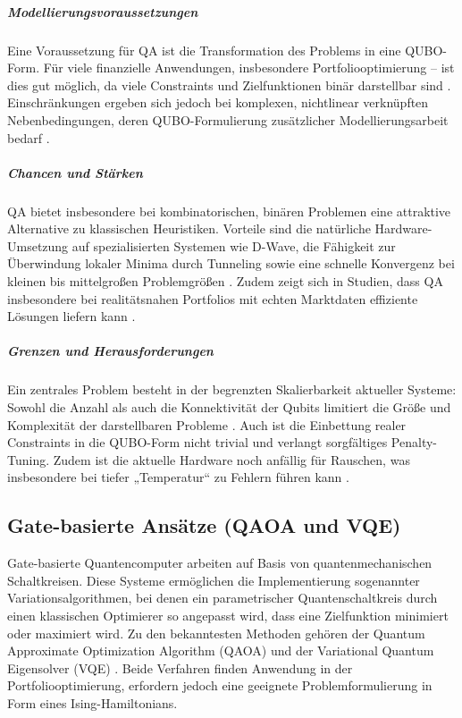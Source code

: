 \subparagraph{Modellierungsvoraussetzungen}
Eine Voraussetzung für QA ist die Transformation des Problems in eine QUBO-Form. Für viele finanzielle Anwendungen, insbesondere Portfoliooptimierung – ist dies gut möglich, da viele Constraints und Zielfunktionen binär darstellbar sind \cite{mugel_dynamic_2022}. Einschränkungen ergeben sich jedoch bei komplexen, nichtlinear verknüpften Nebenbedingungen, deren QUBO-Formulierung zusätzlicher Modellierungsarbeit bedarf \cite{sakuler_real-world_2025}.

\subparagraph{Chancen und Stärken}
QA bietet insbesondere bei kombinatorischen, binären Problemen eine attraktive Alternative zu klassischen Heuristiken. Vorteile sind die natürliche Hardware-Umsetzung auf spezialisierten Systemen wie D-Wave, die Fähigkeit zur Überwindung lokaler Minima durch Tunneling sowie eine schnelle Konvergenz bei kleinen bis mittelgroßen Problemgrößen \cite{mugel_dynamic_2022, sakuler_real-world_2025}. Zudem zeigt sich in Studien, dass QA insbesondere bei realitätsnahen Portfolios mit echten Marktdaten effiziente Lösungen liefern kann \cite{mugel_dynamic_2022}.

\subparagraph{Grenzen und Herausforderungen}
Ein zentrales Problem besteht in der begrenzten Skalierbarkeit aktueller Systeme: Sowohl die Anzahl als auch die Konnektivität der Qubits limitiert die Größe und Komplexität der darstellbaren Probleme \cite{sakuler_real-world_2025}. Auch ist die Einbettung realer Constraints in die QUBO-Form nicht trivial und verlangt sorgfältiges Penalty-Tuning. Zudem ist die aktuelle Hardware noch anfällig für Rauschen, was insbesondere bei tiefer „Temperatur“ zu Fehlern führen kann \cite{Rosenberg2016, sakuler_real-world_2025}.

\subsection{Gate-basierte Ansätze (QAOA und VQE)}

Gate-basierte Quantencomputer arbeiten auf Basis von quantenmechanischen Schaltkreisen. Diese Systeme ermöglichen die Implementierung sogenannter Variationsalgorithmen, bei denen ein parametrischer Quantenschaltkreis durch einen klassischen Optimierer so angepasst wird, dass eine Zielfunktion minimiert oder maximiert wird. Zu den bekanntesten Methoden gehören der Quantum Approximate Optimization Algorithm (QAOA) und der Variational Quantum Eigensolver (VQE) \cite{buonaiuto_best_2023, brandhofer_benchmarking_2022}. Beide Verfahren finden Anwendung in der Portfoliooptimierung, erfordern jedoch eine geeignete Problemformulierung in Form eines Ising-Hamiltonians.


